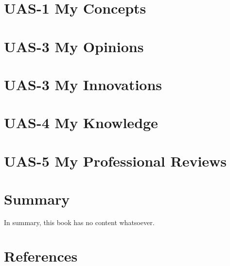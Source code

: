 \documentclass[
  letterpaper,
  DIV=11,
  numbers=noendperiod]{scrreprt}
\begin{document}

\chapter{UAS-1 My Concepts}\label{uas-1-my-concepts}


\chapter{UAS-3 My Opinions}\label{uas-3-my-opinions}


\chapter{UAS-3 My Innovations}\label{uas-3-my-innovations}


\chapter{UAS-4 My Knowledge}\label{uas-4-my-knowledge}


\chapter{UAS-5 My Professional
Reviews}\label{uas-5-my-professional-reviews}


\chapter{Summary}\label{summary}

In summary, this book has no content whatsoever.


\chapter*{References}\label{references}


\label{refs}
\end{document}
